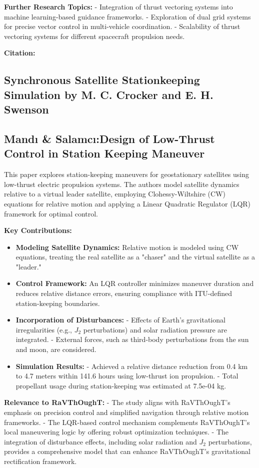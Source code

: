 \textbf{Further Research Topics:}
- Integration of thrust vectoring systems into machine learning-based guidance frameworks.
- Exploration of dual grid systems for precise vector control in multi-vehicle coordination.
- Scalability of thrust vectoring systems for different spacecraft propulsion needs.

\textbf{Citation:} 

\subsection{Synchronous Satellite Stationkeeping Simulation by M. C. Crocker and E. H. Swenson}
\subsection{Mand{\i} \& Salamc{\i}:Design of Low-Thrust Control in Station Keeping Maneuver}

This paper explores station-keeping maneuvers for geostationary satellites using low-thrust electric propulsion systems. The authors model satellite dynamics relative to a virtual leader satellite, employing Clohessy-Wiltshire (CW) equations for relative motion and applying a Linear Quadratic Regulator (LQR) framework for optimal control.

\textbf{Key Contributions:}
\begin{itemize}
  \item \textbf{Modeling Satellite Dynamics:} Relative motion is modeled using CW equations, treating the real satellite as a "chaser" and the virtual satellite as a "leader."
  \item \textbf{Control Framework:} An LQR controller minimizes maneuver duration and reduces relative distance errors, ensuring compliance with ITU-defined station-keeping boundaries.
  \item \textbf{Incorporation of Disturbances:} 
  - Effects of Earth's gravitational irregularities (e.g., \( J_2 \) perturbations) and solar radiation pressure are integrated.
  - External forces, such as third-body perturbations from the sun and moon, are considered.
  \item \textbf{Simulation Results:} 
  - Achieved a relative distance reduction from 0.4 km to 4.7 meters within 141.6 hours using low-thrust ion propulsion.
  - Total propellant usage during station-keeping was estimated at 7.5e-04 kg.
\end{itemize}

\textbf{Relevance to RaVThOughT:}
- The study aligns with RaVThOughT's emphasis on precision control and simplified navigation through relative motion frameworks.
- The LQR-based control mechanism complements RaVThOughT's local maneuvering logic by offering robust optimization techniques.
- The integration of disturbance effects, including solar radiation and \( J_2 \) perturbations, provides a comprehensive model that can enhance RaVThOughT’s gravitational rectification framework.

